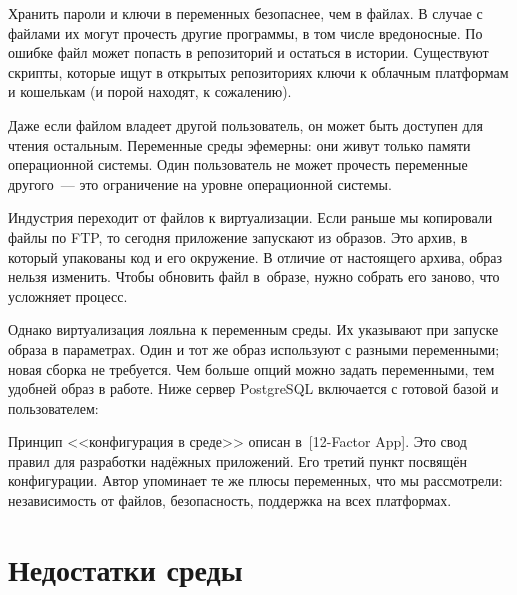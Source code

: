 \label{password-note}


Хранить пароли и ключи в переменных безопаснее, чем в файлах. В случае с файлами
их могут прочесть другие программы, в том числе вредоносные. По ошибке файл
может попасть в репозиторий и остаться в истории. Существуют скрипты, которые
ищут в открытых репозиториях ключи к облачным платформам и кошелькам (и порой
находят, к сожалению).

Даже если файлом владеет другой пользователь, он может быть доступен для чтения
остальным. Переменные среды эфемерны: они живут только памяти операционной
системы. Один пользователь не может прочесть переменные другого~--- это
ограничение на уровне операционной системы.


Индустрия переходит от файлов к виртуализации. Если раньше мы копировали файлы
по FTP, то сегодня приложение запускают из образов. Это архив, в который
упакованы код и его окружение. В отличие от настоящего архива, образ нельзя
изменить. Чтобы обновить файл в~образе, нужно собрать его заново, что усложняет
процесс.


Однако виртуализация лояльна к переменным среды. Их указывают при запуске образа
в параметрах. Один и тот же образ используют с разными переменными; новая сборка
не требуется. Чем больше опций можно задать переменными, тем удобней образ в
работе. Ниже сервер PostgreSQL включается с готовой базой и пользователем:

\begin{english}
\end{english}


Принцип <<конфигурация в среде>> описан в~[12-Factor App].
Это свод правил для разработки надёжных приложений. Его третий пункт посвящён конфигурации.
Автор упоминает те же плюсы переменных, что мы рассмотрели: независимость от файлов,
безопасность, поддержка на всех платформах.

\section{Недостатки среды}

